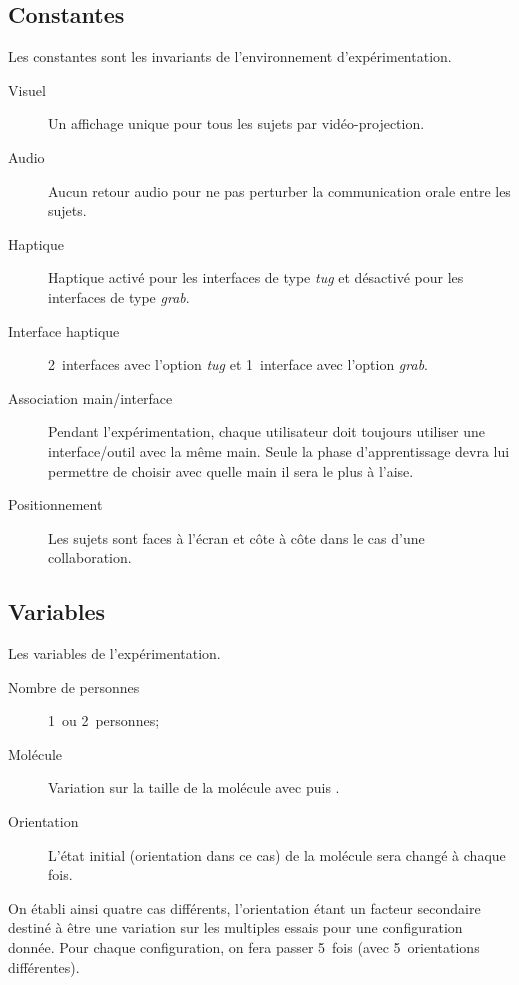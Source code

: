 \documentclass[a4paper,fleqn]{report}
\newcommand{\PHANToM}{\Nom{PHANToM}\xspace}
\newcommand{\Omni}{\Nom{\PHANToM Omni}\xspace}
\begin{document}
			\subsection{Constantes}
				Les constantes sont les invariants de l'environnement d'expérimentation.
				\begin{description}
					\item[Visuel] Un affichage unique pour tous les sujets par vidéo-projection.
					\item[Audio] Aucun retour audio pour ne pas perturber la communication orale entre les sujets.
					\item[Haptique] Haptique activé pour les interfaces de type \emph{tug} et désactivé pour les interfaces de type \emph{grab}.
					\item[Interface haptique] 2~interfaces \Omni avec l'option \emph{tug} et 1~interface \Omni avec l'option \emph{grab}.
					\item[Association main/interface] Pendant l'expérimentation, chaque utilisateur doit toujours utiliser une interface/outil avec la même main.
					Seule la phase d'apprentissage devra lui permettre de choisir avec quelle main il sera le plus à l'aise.
					\item[Positionnement] Les sujets sont faces à l'écran et côte à côte dans le cas d'une collaboration.
				\end{description}
				
			\subsection{Variables}
				Les variables de l'expérimentation.
				\begin{description}
					\item[Nombre de personnes] 1~ou 2~personnes;
					\item[Molécule] Variation sur la taille de la molécule avec  puis .
					\item[Orientation] L'état initial (orientation dans ce cas) de la molécule sera changé à chaque fois.
				\end{description}
				On établi ainsi quatre cas différents, l'orientation étant un facteur secondaire destiné à être une variation sur les multiples essais pour une configuration donnée.
				Pour chaque configuration, on fera passer 5~fois (avec 5~orientations différentes).
				
\end{document}
